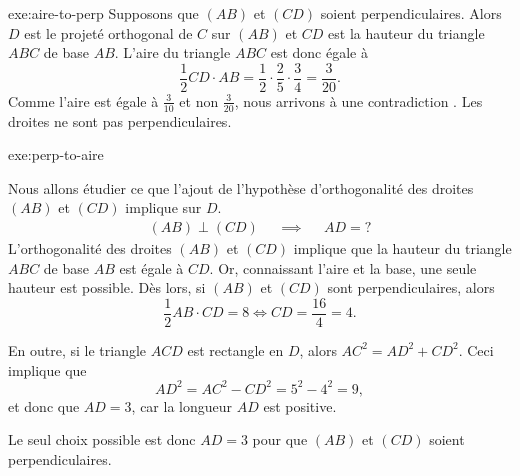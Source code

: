  {exe:aire-to-perp}{
	Supposons que $(AB)$ et $(CD)$ soient perpendiculaires.
	Alors $D$ est le projeté orthogonal de $C$ sur $(AB)$ et $CD$ est la hauteur du triangle $ABC$ de base $AB$.
	L'aire du triangle $ABC$ est donc égale à
		\[ \frac12 CD\cdot AB = \frac12 \cdot \frac25\cdot\frac34 = \frac3{20}. \]
	Comme l'aire est égale à $\frac3{10}$ et non $\frac3{20}$, nous arrivons à une contradiction \Lightning.
	Les droites ne sont pas perpendiculaires.
}

\vspace{-20pt}

 {exe:perp-to-aire}{
	Nous allons étudier ce que l'ajout de l'hypothèse d'orthogonalité des droites $(AB)$ et $(CD)$ implique sur $D$.
		\begin{align*}
			(AB) \perp (CD) && \implies && AD = ?
		\end{align*}
	L'orthogonalité des droites $(AB)$ et $(CD)$ implique que la hauteur du triangle $ABC$ de base $AB$ est égale à $CD$.
	Or, connaissant l'aire et la base, une seule hauteur est possible.
	Dès lors, si $(AB)$ et $(CD)$ sont perpendiculaires, alors
		\[ \frac12AB \cdot CD = 8 \iff CD = \frac{16}{4} = 4. \]
		
	En outre, si le triangle $ACD$ est rectangle en $D$, alors $AC^2 = AD^2 + CD^2$.
	Ceci implique que
		\[ AD^2 = AC^2 - CD^2 = 5^2 - 4^2 = 9, \]
	et donc que $AD = 3$, car la longueur $AD$ est positive.
	
	Le seul choix possible est donc $AD = 3$ pour que $(AB)$ et $(CD)$ soient perpendiculaires.
}



